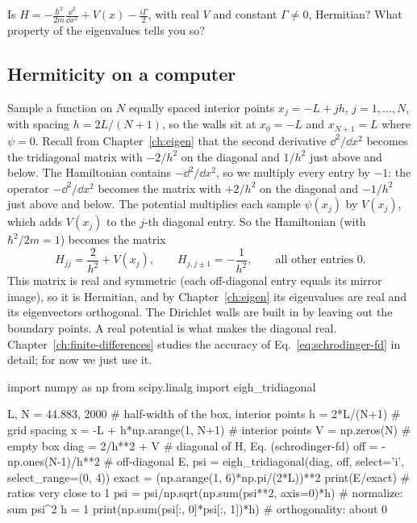 \begin{checkpoint}
Is $H=-\frac{\hbar^2}{2m}\frac{\dd^2}{\dd x^2}+V(x)-\frac{i\Gamma}{2}$, with real $V$ and constant $\Gamma\ne0$, Hermitian? What property of the eigenvalues tells you so?
\end{checkpoint}

\subsection{Hermiticity on a computer}

Sample a function on $N$ equally spaced interior points $x_j=-L+jh$, $j=1,\dots,N$, with spacing $h=2L/(N+1)$, so the walls sit at $x_0=-L$ and $x_{N+1}=L$ where $\psi=0$. Recall from Chapter~\ref{ch:eigen} that the second derivative $\dd^2/\dd x^2$ becomes the tridiagonal matrix with $-2/h^2$ on the diagonal and $1/h^2$ just above and below. The Hamiltonian contains $-\dd^2/\dd x^2$, so we multiply every entry by $-1$: the operator $-\dd^2/\dd x^2$ becomes the matrix with $+2/h^2$ on the diagonal and $-1/h^2$ just above and below. The potential multiplies each sample $\psi(x_j)$ by $V(x_j)$, which adds $V(x_j)$ to the $j$-th diagonal entry. So the Hamiltonian (with $\hbar^2/2m=1$) becomes the matrix
\begin{equation}
H_{jj}=\frac{2}{h^2}+V(x_j),\qquad H_{j,j\pm1}=-\frac1{h^2},\qquad\text{all other entries }0.
\label{eq:schrodinger-fd}
\end{equation}
This matrix is real and symmetric (each off-diagonal entry equals its mirror image), so it is Hermitian, and by Chapter~\ref{ch:eigen} its eigenvalues are real and its eigenvectors orthogonal. The Dirichlet walls are built in by leaving out the boundary points. A real potential is what makes the diagonal real. Chapter~\ref{ch:finite-differences} studies the accuracy of Eq.~\eqref{eq:schrodinger-fd} in detail; for now we just use it.

\begin{pycode}
import numpy as np
from scipy.linalg import eigh_tridiagonal

L, N = 44.883, 2000               # half-width of the box, interior points
h = 2*L/(N+1)                     # grid spacing
x = -L + h*np.arange(1, N+1)      # interior points
V = np.zeros(N)                   # empty box
diag = 2/h**2 + V                 # diagonal of H, Eq. (schrodinger-fd)
off = -np.ones(N-1)/h**2          # off-diagonal
E, psi = eigh_tridiagonal(diag, off, select='i', select_range=(0, 4))
exact = (np.arange(1, 6)*np.pi/(2*L))**2
print(E/exact)                    # ratios very close to 1
psi = psi/np.sqrt(np.sum(psi**2, axis=0)*h)    # normalize: sum psi^2 h = 1
print(np.sum(psi[:, 0]*psi[:, 1])*h)           # orthogonality: about 0
\end{pycode}

